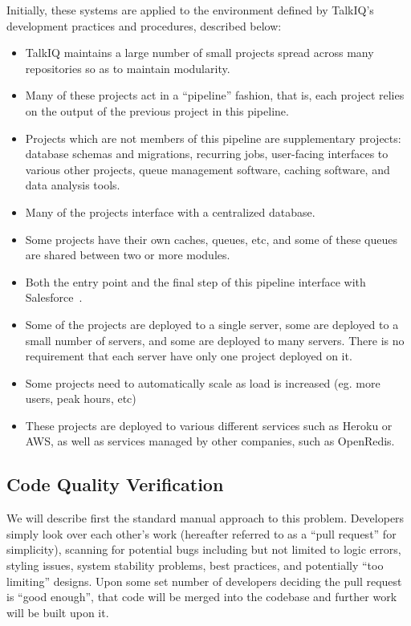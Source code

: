 \documentclass[12pt]{article}
\begin{document}
Initially, these systems are applied to the environment defined by TalkIQ's development practices and procedures, described below:
\begin{itemize}
\item TalkIQ maintains a large number of small projects spread across many repositories so as to maintain modularity.
\item Many of these projects act in a ``pipeline'' fashion, that is, each project relies on the output of the previous project in this pipeline.
\item Projects which are not members of this pipeline are supplementary projects: database schemas and migrations, recurring jobs, user-facing interfaces to various other projects, queue management software, caching software, and data analysis tools.
\item Many of the projects interface with a centralized database.
\item Some projects have their own caches, queues, etc, and some of these queues are shared between two or more modules.
\item Both the entry point and the final step of this pipeline interface with Salesforce~\cite{talkiq}.
\item Some of the projects are deployed to a single server, some are deployed to a small number of servers, and some are deployed to many servers. There is no requirement that each server have only one project deployed on it.
\item Some projects need to automatically scale as load is increased (eg. more users, peak hours, etc)
\item These projects are deployed to various different services such as Heroku or AWS, as well as services managed by other companies, such as OpenRedis.
\end{itemize}

\subsection{Code Quality Verification}
We will describe first the standard manual approach to this problem. Developers simply look over each other's work (hereafter referred to as a ``pull request'' for simplicity), scanning for potential bugs including but not limited to logic errors, styling issues, system stability problems, best practices, and potentially ``too limiting'' designs. Upon some set number of developers deciding the pull request is ``good enough'', that code will be merged into the codebase and further work will be built upon it.
\end{document}
